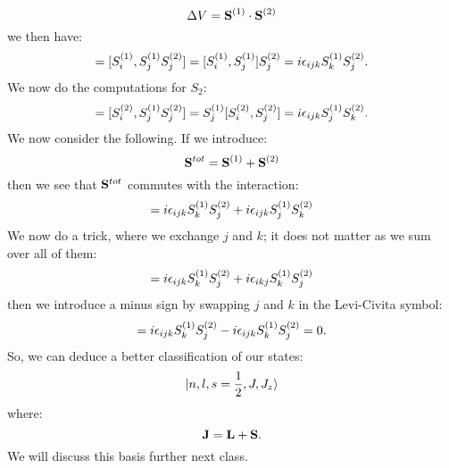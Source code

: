 \begin{equation}
    \Delta V = \mathbf{S}^{(1)} \cdot \mathbf{S}^{(2)}
\end{equation}
we then have:
\begin{equation}
    [S^{(1)}_i, \Delta V] = [S_i^{(1)}, S_j^{(1)}S_j^{(2)}] = [S_i^{(1)}, S_j^{(1)}]S_j^{(2)} = i\e_{ijk}S_k^{(1)}S_j^{(2)}.
\end{equation}
We now do the computations for $S_2$:
\begin{equation}
    [S_i^{(2)}, \Delta V] = [S_i^{(2)}, S_j^{(1)}S_j^{(2)}] = S_j^{(1)}[S_i^{(2)}, S_j^{(2)}] = i\e_{ijk}S_j^{(1)}S_k^{(2)}.
\end{equation}
We now consider the following. If we introduce:
\begin{equation}
    \mathbf{S}^{tot} = \mathbf{S}^{(1)} + \mathbf{S}^{(2)}
\end{equation}
then we see that $\mathbf{S}^{tot}$ commutes with the interaction:
\begin{equation}
    [S_i^{(1)} + S_i^{(2)}, \Delta V] = i\e_{ijk}S_k^{(1)}S_j^{(2)} + i\e_{ijk}S_j^{(1)}S_k^{(2)}
\end{equation}
We now do a trick, where we exchange $j$ and $k$; it does not matter as we sum over all of them:
\begin{equation}
    [S_i^{(1)} + S_i^{(2)}, \Delta V] = i\e_{ijk}S_k^{(1)}S_j^{(2)} + i\e_{ikj}S_k^{(1)}S_j^{(2)}
\end{equation}
then we introduce a minus sign by swapping $j$ and $k$ in the Levi-Civita symbol:
\begin{equation}
    [S_i^{(1)} + S_i^{(2)}, \Delta V] = i\e_{ijk}S_k^{(1)}S_j^{(2)} - i\e_{ijk}S_k^{(1)}S_j^{(2)} = 0.
\end{equation}
So, we can deduce a better classification of our states:
\begin{equation}
    \lvert n, l, s = \frac{1}{2}, J, J_z \rangle
\end{equation}
where:
\begin{equation}
    \mathbf{J} = \mathbf{L} + \mathbf{S}.
\end{equation}
We will discuss this basis further next class.